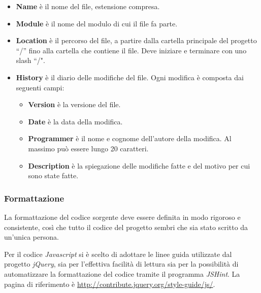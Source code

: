 \begin{itemize}
 \item \textbf{Name} è il nome del file, estensione compresa.
 \item \textbf{Module} è il nome del modulo di cui il file fa parte.
 \item \textbf{Location} è il percorso del file, a partire dalla cartella principale del progetto ``/'' fino alla cartella che contiene il file. Deve iniziare e terminare con uno slash ``/".
 \item \textbf{History} è il diario delle modifiche del file. Ogni modifica è composta dai seguenti campi:
 
    \begin{itemize}
     \item \textbf{Version} è la versione del file.
     \item \textbf{Date} è la data della modifica.
     \item \textbf{Programmer} è il nome e cognome dell'autore della modifica. Al massimo può essere lungo 20 caratteri.
     \item \textbf{Description} è la spiegazione delle modifiche fatte e del motivo per cui sono state fatte.    
    \end{itemize}
\end{itemize}

\subsubsection{Formattazione}

La formattazione del codice sorgente deve essere definita in modo rigoroso e consistente, così che tutto il codice del progetto sembri che sia stato scritto da un'unica persona.

Per il codice \emph{Javascript} si è scelto di adottare le linee guida utilizzate dal progetto \emph{jQuery}, sia per l'effettiva facilità di lettura sia per la possibilità di automatizzare la formattazione del codice tramite il programma \emph{JSHint}. La pagina di riferimento è \url{http://contribute.jquery.org/style-guide/js/}.

